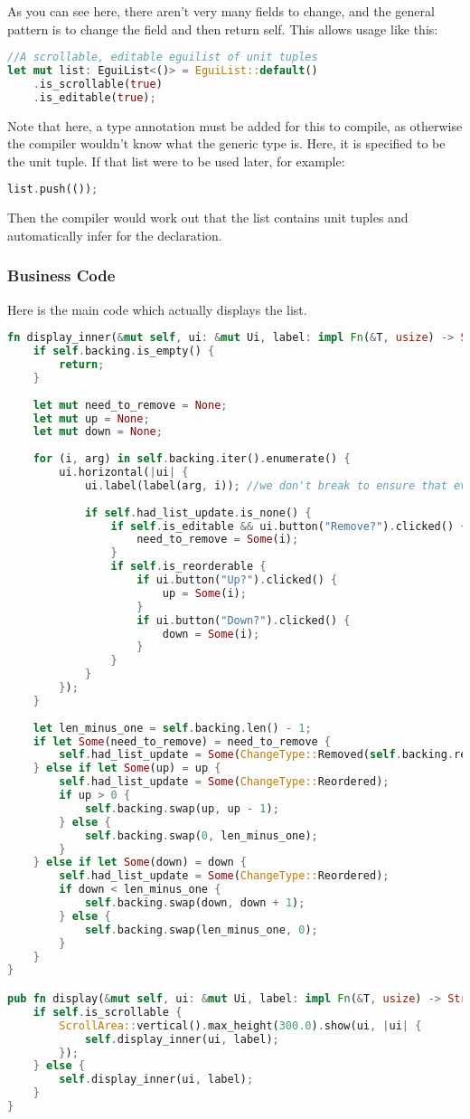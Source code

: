 \documentclass{article}
\begin{document}
As you can see here, there aren't very many fields to change, and the general pattern is to change the field and then return self. This allows usage like this:

\begin{lstlisting}[language=Rust]
//A scrollable, editable eguilist of unit tuples
let mut list: EguiList<()> = EguiList::default()
	.is_scrollable(true)
	.is_editable(true);
\end{lstlisting}

Note that here, a type annotation must be added for this to compile, as otherwise the compiler wouldn't know what the generic type is. Here, it is specified to be the unit tuple. If that list were to be used later, for example:
\begin{lstlisting}[language=Rust]
list.push(());
\end{lstlisting}
Then the compiler would work out that the list contains unit tuples and automatically infer for the declaration.

\subsubsection{Business Code}
Here is the main code which actually displays the list.

\begin{lstlisting}[language=Rust]
fn display_inner(&mut self, ui: &mut Ui, label: impl Fn(&T, usize) -> String) {
	if self.backing.is_empty() {
		return;
	}
	
	let mut need_to_remove = None; 
	let mut up = None; 
	let mut down = None;
	
	for (i, arg) in self.backing.iter().enumerate() {
		ui.horizontal(|ui| {
			ui.label(label(arg, i)); //we don't break to ensure that everything always gets drawn, but we still skip over lots of logic if we have a change
			
			if self.had_list_update.is_none() {
				if self.is_editable && ui.button("Remove?").clicked() {
					need_to_remove = Some(i);
				}
				if self.is_reorderable {
					if ui.button("Up?").clicked() {
						up = Some(i);
					}
					if ui.button("Down?").clicked() {
						down = Some(i);
					}
				}
			}
		});
	}
	
	let len_minus_one = self.backing.len() - 1;
	if let Some(need_to_remove) = need_to_remove {
		self.had_list_update = Some(ChangeType::Removed(self.backing.remove(need_to_remove)));
	} else if let Some(up) = up {
		self.had_list_update = Some(ChangeType::Reordered);
		if up > 0 {
			self.backing.swap(up, up - 1);
		} else {
			self.backing.swap(0, len_minus_one);
		}
	} else if let Some(down) = down {
		self.had_list_update = Some(ChangeType::Reordered);
		if down < len_minus_one {
			self.backing.swap(down, down + 1);
		} else {
			self.backing.swap(len_minus_one, 0);
		}
	}
}

pub fn display(&mut self, ui: &mut Ui, label: impl Fn(&T, usize) -> String) {
	if self.is_scrollable {
		ScrollArea::vertical().max_height(300.0).show(ui, |ui| {
			self.display_inner(ui, label);
		});
	} else {
		self.display_inner(ui, label);
	}
}
\end{lstlisting}
\end{document}
